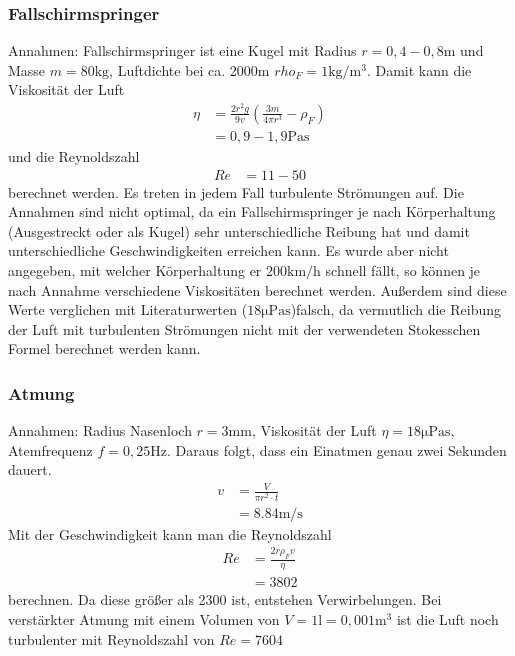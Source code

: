 \documentclass[11pt, a4paper]{article}
\begin{document}
    \subsubsection{Fallschirmspringer}
    Annahmen: Fallschirmspringer ist eine Kugel mit Radius $r = 0,4 - 0,8 \si{\metre}$ und Masse $m = 80 \si{\kilogram}$, Luftdichte bei ca. 2000m $rho_F = 1 \si{\kilogram\per\cubic\metre}$.
    Damit kann die Viskosität der Luft
    \begin{align}
        \eta &= \frac{2 r^2 g}{9 v}(\frac{3m}{4 \pi r^3} - \rho_F) \nonumber \\
        &= 0,9 - 1,9 \si{\pascal\second}
    \end{align}
    und die Reynoldszahl
    \begin{align}
        Re &= 11 - 50
    \end{align}
    berechnet werden. Es treten in jedem Fall turbulente Strömungen auf. Die Annahmen sind nicht optimal, da ein Fallschirmspringer je nach Körperhaltung (Ausgestreckt oder als Kugel)
    sehr unterschiedliche Reibung hat und damit unterschiedliche Geschwindigkeiten erreichen kann. Es wurde aber nicht angegeben, mit welcher Körperhaltung
    er $200 \si{\kilo\metre\per\hour}$  schnell fällt, so können je nach Annahme verschiedene Viskositäten berechnet werden.
    Außerdem sind diese Werte verglichen mit Literaturwerten ($18 \si{\micro\pascal\second}$)falsch, da vermutlich die Reibung der Luft mit turbulenten Strömungen
    nicht mit der verwendeten Stokesschen Formel \cite[(9)]{VIS} berechnet werden kann.

    \subsubsection{Atmung}
    Annahmen: Radius Nasenloch $r = 3 \si{\milli\metre}$,  Viskosität der Luft $\eta = 18 \si{\micro\pascal\second}$,
    Atemfrequenz $f = 0,25 \si{\hertz}$. Daraus folgt, dass ein Einatmen genau zwei Sekunden dauert.
    \begin{align}
        v &= \frac{V}{\pi r ^2 \cdot t} \nonumber \\
            &= 8.84 \si{\metre\per\second}
    \end{align}
    Mit der Geschwindigkeit kann man die Reynoldszahl
    \begin{align}
        Re &= \frac{2r \rho_F v}{\eta} \nonumber \\
        &= 3802
    \end{align}
    berechnen. Da diese größer als 2300 ist, entstehen Verwirbelungen.
	Bei verstärkter Atmung mit einem Volumen von $V = 1 \si{\litre} = 0,001 \si{\metre\cubed}$
	ist die Luft noch turbulenter mit Reynoldszahl von $Re = 7604$
    
    
\end{document}
